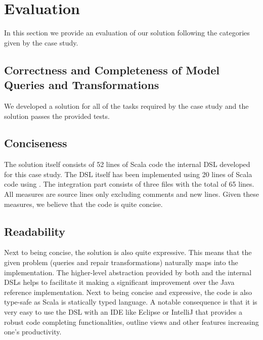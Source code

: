 

\section{Evaluation}
\label{sec:Evaluation}

In this section we provide an evaluation of our solution following the categories given by the case study.

\subsection{Correctness and Completeness of Model Queries and Transformations}

We developed a solution for all of the tasks required by the case study and the solution passes the provided tests.

\subsection{Conciseness}

The solution itself consists of 52 lines of Scala code the internal DSL developed for this case study.
The DSL itself has been implemented using 20 lines of Scala code using \SIGMA.
The integration part consists of three files with the total of 65 lines.
All measures are source lines only excluding comments and new lines.
Given these measures, we believe that the code is quite concise.

\subsection{Readability}

Next to being concise, the solution is also quite expressive.
This means that the given problem (queries and repair transformations) naturally maps into the implementation.
The higher-level abstraction provided by both \SIGMA and the internal DSLs helps to facilitate it making a significant improvement over the Java reference implementation.
%
Next to being concise and expressive, the code is also type-safe as Scala is statically typed language.
A notable consequence is that it is very easy to use the DSL with an IDE like Eclipse or IntelliJ that provides a robust code completing functionalities, outline views and other features increasing one's productivity.

